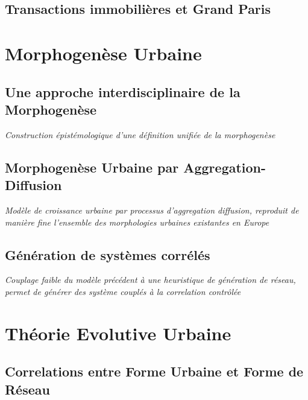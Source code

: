


\subsection{Transactions immobilières et Grand Paris}



\section{Morphogenèse Urbaine}

\subsection{Une approche interdisciplinaire de la Morphogenèse}

\textit{Construction épistémologique d'une définition unifiée de la morphogenèse~\cite{antelope2016interdisciplinary}}


\subsection{Morphogenèse Urbaine par Aggregation-Diffusion}

\textit{Modèle de croissance urbaine par processus d'aggregation diffusion, reproduit de manière fine l'ensemble des morphologies urbaines existantes en Europe} 


\subsection{Génération de systèmes corrélés}

\textit{Couplage faible du modèle précédent à une heuristique de génération de réseau, permet de générer des système couplés à la correlation contrôlée~\cite{raimbault2016generation}}


\section{Théorie Evolutive Urbaine}

\subsection{Correlations entre Forme Urbaine et Forme de Réseau}

